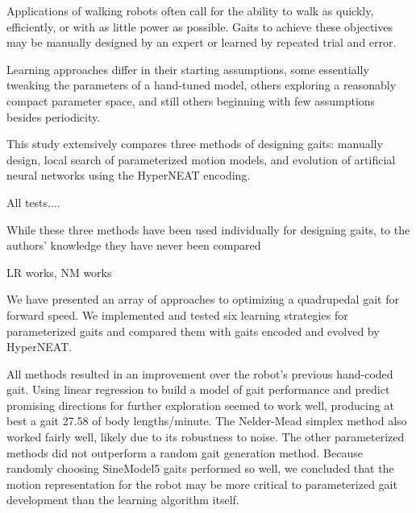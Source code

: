 Applications of walking robots often call for the ability to walk as
quickly, efficiently, or with as little power as possible.  Gaits to
achieve these objectives may be manually designed by an expert or
learned by repeated trial and error.

Learning approaches differ in their starting assumptions, some
essentially tweaking the parameters of a hand-tuned model, others
exploring a reasonably compact parameter space, and still others
beginning with few assumptions besides periodicity.

This study extensively compares three methods of designing gaits:
manually design, local search of parameterized motion models, and
evolution of artificial neural networks using the HyperNEAT encoding.

All tests....

While these three methods have been used individually for designing
gaits, to the authors' knowledge they have never been compared 

LR works, NM works




We have presented an array of approaches to optimizing a quadrupedal
gait for forward speed.  We implemented and tested six learning
strategies for parameterized gaits and compared them with gaits
encoded and evolved by HyperNEAT.

All methods resulted in an improvement over the robot's previous
hand-coded gait.  Using linear regression to build a model of gait
performance and predict promising directions for further exploration
seemed to work well, producing at best a gait 27.58 of body
lengths/minute.  The Nelder-Mead simplex method also worked fairly
well, likely due to its robustness to noise.  The other parameterized
methods did not outperform a random gait generation method.  Because
randomly choosing SineModel5 gaits performed so well, we concluded
that the motion representation for the robot may be more critical to
parameterized gait development than the learning algorithm itself.

